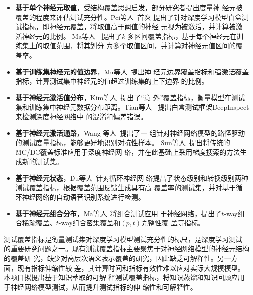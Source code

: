 \begin{itemize}
	\item \textbf{基于单个神经元取值}，受结构覆盖思想启发，部分研究者提出度量神
	      经元被覆盖的程度来评估测试充分性。Pei等人~\cite{Pei2019DeepXplore}首次
	      提出了针对深度学习模型白盒测试指标，即神经元覆盖，将取值高于阈值的神经
	      元视为被激活，并计算被激活神经元的比例。 Ma等人~\cite{ma2018deepgauge}
	      提出了$k$-多区间覆盖指标，基于每个神经元在训练集上的取值范围，将其划分
	      为多个取值区间，并计算对神经元值区间的覆盖率。

	\item \textbf{基于训练集神经元的值边界}，Ma等人~\cite{ma2018deepgauge}提出神
	经元边界覆盖指标和强激活覆盖指标，计算测试集中神经元的值超过训练集的上下边界
	的比例。

	\item \textbf{基于神经元激活值分布}，Kim等人~\cite{Kim2019Guiding}提出了“意
	      外”覆盖指标，衡量模型在测试集和训练集中神经元数据分布距离。Tian等人
	      ~\cite{Tian2019Testing}提出白盒测试框架DeepInspect来检测深度神经网络中
	      的混淆和偏差错误。

	\item \textbf{基于神经元激活通路}，Wang 等人~\cite{Wang2019DeepPath}提出了一
	      组针对神经网络模型的路径驱动的测试度量指标，能够更好地识别对抗性样本。
	      Sun等人~\cite{Sun2018Testing}提出将传统的MC/DC覆盖标准应用于深度神经网
	      络，并在此基础上采用梯度搜索的方法生成新的测试集。

	\item \textbf{基于神经元状态}，Du等人~\cite{Du2018DeepCruiser}针对循环神经网
	      络提出了状态级别和转换级别两种测试覆盖指标，根据覆盖范围反馈生成具有高
	      覆盖率的测试集，并对基于循环神经网络的自动语音识别系统进行检测。

	\item \textbf{基于神经元组合分布}，Ma等人~\cite{ma2019deepct}将组合测试应用
	于神经网络，提出了$t$-way组合稀疏覆盖、$t$-way组合密集覆盖和$(p,t)$完整性覆
	盖等指标。
\end{itemize}

{\kaishu 测试覆盖指标是衡量测试集对深度学习模型测试充分性的标尺，是深度学习测试
的重要研究问题之一。现有测试覆盖指标主要聚焦于对神经网络模型的神经元结构的覆盖研
究，缺少对高层次语义表示覆盖的研究，因此缺乏可解释性。另一方面，现有指标伸缩性较
差，其计算时间和指标有效性难以应对实际大规模模型。本项目拟提出基于知识萃取的可解
释测试覆盖指标，将知识蒸馏和知识回顾应用于神经网络模型测试，从而提升测试指标的伸
缩性和可解释性。}


